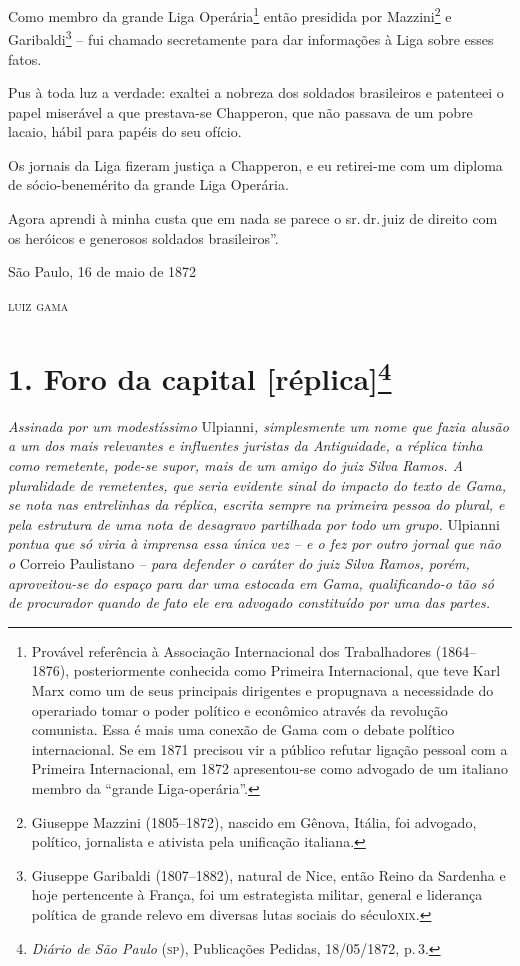 Como membro da grande Liga Operária\footnote{ Provável referência à
  Associação Internacional dos Trabalhadores (1864--1876), posteriormente
  conhecida como Primeira Internacional, que teve Karl Marx como um de
  seus principais dirigentes e propugnava a necessidade do operariado
  tomar o poder político e econômico através da revolução comunista.
  Essa é mais uma conexão de Gama com o debate político internacional.
  Se em 1871 precisou vir a público refutar ligação pessoal com a
  Primeira Internacional, em 1872 apresentou-se como advogado de um
  italiano membro da ``grande Liga-operária''.} então presidida por
Mazzini\footnote{ Giuseppe Mazzini (1805--1872), nascido em Gênova,
  Itália, foi advogado, político, jornalista e ativista pela unificação
  italiana.} e Garibaldi\footnote{ Giuseppe Garibaldi (1807--1882),
  natural de Nice, então Reino da Sardenha e hoje pertencente à França,
  foi um estrategista militar, general e liderança política de grande
  relevo em diversas lutas sociais do século\textsc{xix}.} -- fui chamado
secretamente para dar informações à Liga sobre esses fatos.

Pus à toda luz a verdade: exaltei a nobreza dos soldados brasileiros e
patenteei o papel miserável a que prestava-se Chapperon, que não passava
de um pobre lacaio, hábil para papéis do seu ofício.

Os jornais da Liga fizeram justiça a Chapperon, e eu retirei-me com um
diploma de sócio-benemérito da grande Liga Operária.

Agora aprendi à minha custa que em nada se parece o sr.\,dr.\,juiz de
direito com os heróicos e generosos soldados brasileiros''.

\begin{flushright}
São Paulo, 16 de maio de 1872

\textsc{luiz gama}
\end{flushright}

\chapter{1. Foro da capital {[}réplica{]}\footnote{\emph{Diário de São Paulo} (\textsc{sp}), Publicações Pedidas,
  18/05/1872, p.\,3.}} %

\begin{didascalia}
\emph{Assinada por um modestíssimo} Ulpianni\emph{, simplesmente um nome
que fazia alusão a um dos mais relevantes e influentes juristas da
Antiguidade, a réplica tinha como remetente, pode-se supor, mais de um
amigo do juiz Silva Ramos. A pluralidade de remetentes, que seria
evidente sinal do impacto do texto de Gama, se nota nas entrelinhas da
réplica, escrita sempre na primeira pessoa do plural, e pela estrutura
de uma nota de desagravo partilhada por todo um grupo.} Ulpianni
\emph{pontua que só viria à imprensa essa única vez -- e o fez por outro
jornal que não o} Correio Paulistano \emph{-- para defender o caráter do
juiz Silva Ramos, porém, aproveitou-se do espaço para dar uma estocada
em Gama, qualificando-o tão só de procurador quando de fato ele era
advogado constituído por uma das partes.}
\end{didascalia}

